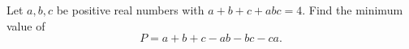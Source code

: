 Let $a,b,c$ be positive real numbers with $a+b+c+abc=4$. Find the minimum value of
\[
P=a+b+c-ab-bc-ca .
\]
